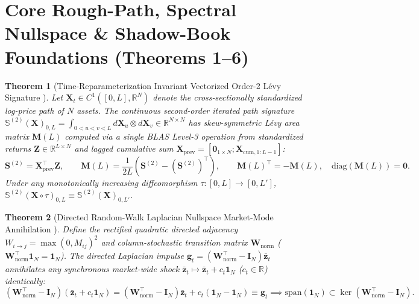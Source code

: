 \documentclass[10pt,a4paper]{article}
\newtheorem{theorem}{Theorem}[section]
\begin{document}
\section{Core Rough-Path, Spectral Nullspace \& Shadow-Book Foundations (Theorems 1--6)}

\begin{theorem}[Time-Reparameterization Invariant Vectorized Order-2 Lévy Signature \cite{lyons2007}]
Let $\mathbf{X}_t \in C^1([0, L], \mathbb{R}^N)$ denote the cross-sectionally standardized log-price path of $N$ assets. The continuous second-order iterated path signature $\mathbb{S}^{(2)}(\mathbf{X})_{0, L} = \int_{0 < u < v < L} d\mathbf{X}_u \otimes d\mathbf{X}_v \in \mathbb{R}^{N \times N}$ has skew-symmetric Lévy area matrix $\mathbf{M}(L)$ computed via a single BLAS Level-3 operation from standardized returns $\mathbf{Z} \in \mathbb{R}^{L \times N}$ and lagged cumulative sum $\mathbf{X}_{\mathrm{prev}} = [\mathbf{0}_{1 \times N}; \mathbf{X}_{\mathrm{cum}, 1:L-1}]$:
\begin{equation}
  \mathbf{S}^{(2)} = \mathbf{X}_{\mathrm{prev}}^\top \mathbf{Z}, \qquad \mathbf{M}(L) = \frac{1}{2L}\left(\mathbf{S}^{(2)} - (\mathbf{S}^{(2)})^\top\right), \qquad \mathbf{M}(L)^\top = -\mathbf{M}(L), \quad \mathrm{diag}(\mathbf{M}(L)) = \mathbf{0}.
\end{equation}
Under any monotonically increasing diffeomorphism $\tau: [0, L] \to [0, L']$, $\mathbb{S}^{(2)}(\mathbf{X} \circ \tau)_{0, L} \equiv \mathbb{S}^{(2)}(\mathbf{X})_{0, L'}$.
\end{theorem}

\begin{theorem}[Directed Random-Walk Laplacian Nullspace Market-Mode Annihilation \cite{chung1997}]
Define the rectified quadratic directed adjacency $W_{i \to j} = \max(0, M_{ij})^2$ and column-stochastic transition matrix $\mathbf{W}_{\mathrm{norm}}$ ($\mathbf{W}_{\mathrm{norm}}^\top \mathbf{1}_N = \mathbf{1}_N$). The directed Laplacian impulse $\mathbf{g}_t = (\mathbf{W}_{\mathrm{norm}}^\top - \mathbf{I}_N)\bar{\mathbf{z}}_t$ annihilates any synchronous market-wide shock $\bar{\mathbf{z}}_t \mapsto \bar{\mathbf{z}}_t + c_t \mathbf{1}_N$ ($c_t \in \mathbb{R}$) identically:
\begin{equation}
  (\mathbf{W}_{\mathrm{norm}}^\top - \mathbf{I}_N)(\bar{\mathbf{z}}_t + c_t \mathbf{1}_N) = (\mathbf{W}_{\mathrm{norm}}^\top - \mathbf{I}_N)\bar{\mathbf{z}}_t + c_t(\mathbf{1}_N - \mathbf{1}_N) \equiv \mathbf{g}_t \implies \mathrm{span}(\mathbf{1}_N) \subset \ker(\mathbf{W}_{\mathrm{norm}}^\top - \mathbf{I}_N).
\end{equation}
\end{theorem}
\end{document}
